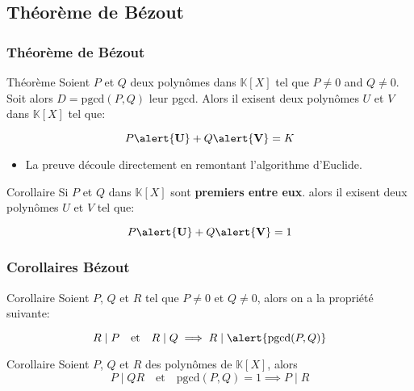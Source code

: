 \documentclass{beamer}
\newcommand{\setK}{\mathbb{K}}
\begin{document}
\subsection{Théorème de Bézout}
\begin{frame}[t]
  \frametitle{Théorème de Bézout}
\begin{block}{Théorème}
  Soient $P$ et $Q$ deux polynômes dans $\setK[X]$ tel que $P\neq 0$ and $Q\neq
  0$. Soit alors $D=\text{pgcd}(P,Q)$ leur pgcd. Alors il exisent deux polynômes
  $U$ et $V$ dans $\setK[X]$ tel que:

  \begin{equation}
    P\alert{\mathbf{U}} + Q\alert{\mathbf{V}} = K
  \end{equation}
\end{block}  

\pause
\begin{itemize}
  \small
\item La preuve découle directement en \alert{remontant} l'algorithme d'Euclide.
\end{itemize}
\pause

\begin{block}{Corollaire}
  Si $P$ et $Q$ dans $\setK[X]$ sont \textbf{premiers entre eux}. alors il exisent deux
  polynômes $U$ et $V$ tel que:

  \begin{equation}
    P\alert{\mathbf{U}} + Q\alert{\mathbf{V}} = 1
  \end{equation}
\end{block}

\end{frame}

\begin{frame}[<+->]
  \frametitle{Corollaires Bézout}
 \begin{block}{Corollaire}
  Soient $P$, $Q$ et $R$ tel que $P\neq 0$ et $Q\neq 0$, alors on a la propriété
  suivante:

  \begin{equation}
    R\;\vert\; P \quad \text{et}\quad R\;|\; Q \implies R\;|\;
    \alert{\text{pgcd}(P,Q)}
  \end{equation}
 \end{block} 

 \pause

 \begin{block}{Corollaire}
   Soient $P$, $Q$ et $R$ des polynômes de $\setK[X]$, alors
   \begin{equation}
     P\;|\; QR \quad \text{et}\quad \text{pgcd}(P,Q)=1 \implies P\;|\;R
   \end{equation}
 \end{block}
\end{frame}
\end{document}

